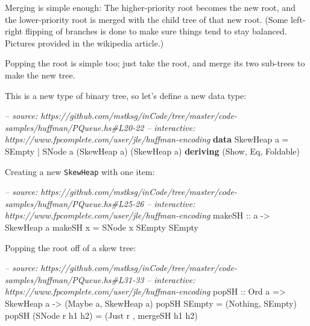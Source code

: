 \documentclass[]{article}
\newenvironment{Shaded}{}{}
\newcommand{\KeywordTok}[1]{\textcolor[rgb]{0.00,0.44,0.13}{\textbf{#1}}}
\newcommand{\DataTypeTok}[1]{\textcolor[rgb]{0.56,0.13,0.00}{#1}}
\newcommand{\CommentTok}[1]{\textcolor[rgb]{0.38,0.63,0.69}{\textit{#1}}}
\newcommand{\OtherTok}[1]{\textcolor[rgb]{0.00,0.44,0.13}{#1}}
\newcommand{\FunctionTok}[1]{\textcolor[rgb]{0.02,0.16,0.49}{#1}}
\newcommand{\NormalTok}[1]{#1}
\begin{document}
Merging is simple enough: The higher-priority root becomes the new root, and the
lower-priority root is merged with the child tree of that new root. (Some
left-right flipping of branches is done to make sure things tend to stay
balanced. Pictures provided in the wikipedia article.)

Popping the root is simple too; just take the root, and merge its two sub-trees
to make the new tree.

This is a new type of binary tree, so let's define a new data type:

\begin{Shaded}
\begin{Highlighting}[]
\CommentTok{-- source: https://github.com/mstksg/inCode/tree/master/code-samples/huffman/PQueue.hs#L20-22}
\CommentTok{-- interactive: https://www.fpcomplete.com/user/jle/huffman-encoding}
\KeywordTok{data} \DataTypeTok{SkewHeap}\NormalTok{ a }\FunctionTok{=} \DataTypeTok{SEmpty}
                \FunctionTok{|} \DataTypeTok{SNode}\NormalTok{ a (}\DataTypeTok{SkewHeap}\NormalTok{ a) (}\DataTypeTok{SkewHeap}\NormalTok{ a)}
                \KeywordTok{deriving}\NormalTok{ (}\DataTypeTok{Show}\NormalTok{, }\DataTypeTok{Eq}\NormalTok{, }\DataTypeTok{Foldable}\NormalTok{)}
\end{Highlighting}
\end{Shaded}

Creating a new \texttt{SkewHeap} with one item:

\begin{Shaded}
\begin{Highlighting}[]
\CommentTok{-- source: https://github.com/mstksg/inCode/tree/master/code-samples/huffman/PQueue.hs#L25-26}
\CommentTok{-- interactive: https://www.fpcomplete.com/user/jle/huffman-encoding}
\OtherTok{makeSH ::}\NormalTok{ a }\OtherTok{->} \DataTypeTok{SkewHeap}\NormalTok{ a}
\NormalTok{makeSH x }\FunctionTok{=} \DataTypeTok{SNode}\NormalTok{ x }\DataTypeTok{SEmpty} \DataTypeTok{SEmpty}
\end{Highlighting}
\end{Shaded}

Popping the root off of a skew tree:

\begin{Shaded}
\begin{Highlighting}[]
\CommentTok{-- source: https://github.com/mstksg/inCode/tree/master/code-samples/huffman/PQueue.hs#L31-33}
\CommentTok{-- interactive: https://www.fpcomplete.com/user/jle/huffman-encoding}
\OtherTok{popSH ::} \DataTypeTok{Ord}\NormalTok{ a }\OtherTok{=>} \DataTypeTok{SkewHeap}\NormalTok{ a }\OtherTok{->}\NormalTok{ (}\DataTypeTok{Maybe}\NormalTok{ a, }\DataTypeTok{SkewHeap}\NormalTok{ a)}
\NormalTok{popSH }\DataTypeTok{SEmpty}          \FunctionTok{=}\NormalTok{ (}\DataTypeTok{Nothing}\NormalTok{, }\DataTypeTok{SEmpty}\NormalTok{)}
\NormalTok{popSH (}\DataTypeTok{SNode}\NormalTok{ r h1 h2) }\FunctionTok{=}\NormalTok{ (}\DataTypeTok{Just}\NormalTok{ r , mergeSH h1 h2)}
\end{Highlighting}
\end{Shaded}
\end{document}
